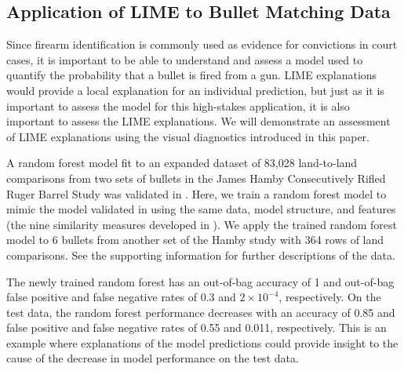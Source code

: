\documentclass[AMS,STIX2COL]{WileyNJD-v2}\usepackage[]{graphicx}\usepackage[]{color}
\newenvironment{knitrout}{}{} %
\begin{document}
\subsection{Application of LIME to Bullet Matching Data}


Since firearm identification is commonly used as evidence for convictions in court cases, it is important to be able to understand and assess a model used to quantify the probability that a bullet is fired from a gun. LIME explanations would provide a local explanation for an individual prediction, but just as it is important to assess the model for this high-stakes application, it is also important to assess the LIME explanations. We will demonstrate an assessment of LIME explanations using the visual diagnostics introduced in this paper.

A random forest model fit to an expanded dataset of 83,028 land-to-land comparisons from two sets of bullets in the James Hamby Consecutively Rifled Ruger Barrel Study \citep{hamby:2009} was validated in \citet{vanderplas:2020}. Here, we train a random forest model to mimic the model validated in \citet{vanderplas:2020} using the same data, model structure, and features (the nine similarity measures developed in \citet{hare:2017}). We apply the trained random forest model to 6 bullets from another set of the Hamby study with 364 rows of land comparisons. See the supporting information for further descriptions of the data. 

The newly trained random forest has an out-of-bag accuracy of 1 and out-of-bag false positive and false negative rates of 0.3 and \ensuremath{2\times 10^{-4}}, respectively. On the test data, the random forest performance decreases with an accuracy of 0.85 and false positive and false negative rates of 0.55 and 0.011, respectively. This is an example where explanations of the model predictions could provide insight to the cause of the decrease in model performance on the test data.
\end{document}
